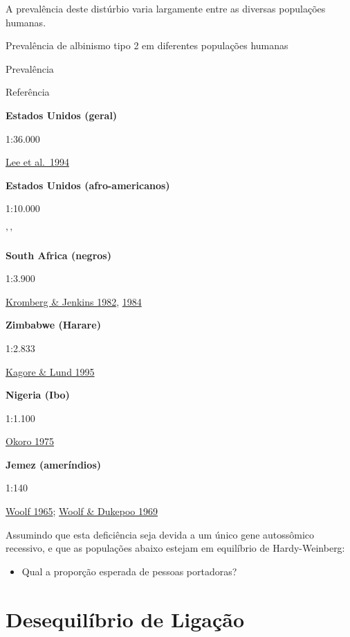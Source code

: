 \documentclass[
]{book}
\providecommand{\tightlist}{%
  \setlength{\itemsep}{0pt}\setlength{\parskip}{0pt}}
\begin{document}
A prevalência deste distúrbio varia largamente entre as diversas populações humanas.

\label{tab:tableC05}Prevalência de albinismo tipo 2 em diferentes populações humanas

Prevalência

Referência

\textbf{Estados Unidos (geral)}

1:36.000

\href{https://doi.org/10.1056/NEJM199402243300803}{Lee et al.~1994}

\textbf{Estados Unidos (afro-americanos)}

1:10.000

'\,'

\textbf{South Africa (negros)}

1:3.900

\href{https://pubmed.ncbi.nlm.nih.gov/7064008/}{Kromberg \& Jenkins 1982}, \href{https://doi.org/10.1017/S0021932000014838}{1984}

\textbf{Zimbabwe (Harare)}

1:2.833

\href{http://dx.doi.org/10.1136/jmg.32.11.859}{Kagore \& Lund 1995}

\textbf{Nigeria (Ibo)}

1:1.100

\href{https://doi.org/10.1111/j.1365-2133.1975.tb03116.x}{Okoro 1975}

\textbf{Jemez (ameríndios)}

1:140

\href{https://pubmed.ncbi.nlm.nih.gov/14255554/}{Woolf 1965}; \href{https://doi.org/10.1126/science.164.3875.30}{Woolf \& Dukepoo 1969}

Assumindo que esta deficiência seja devida a um único gene autossômico recessivo, e que as populações abaixo estejam em equilíbrio de Hardy-Weinberg:

\begin{itemize}
\tightlist
\item
  Qual a proporção esperada de pessoas portadoras?
\end{itemize}

\hypertarget{desequiluxedbrio-de-ligauxe7uxe3o}{%
\chapter{Desequilíbrio de Ligação}\label{desequiluxedbrio-de-ligauxe7uxe3o}}
\end{document}
